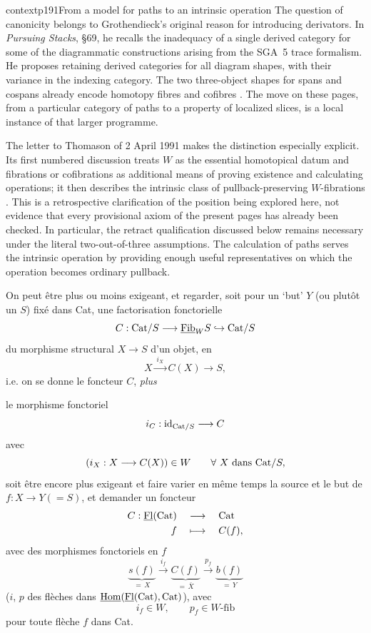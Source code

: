 \begin{dcomment}{context}{p191}{From a model for paths to an intrinsic operation}
The question of canonicity belongs to Grothendieck's original reason for introducing derivators. In \emph{Pursuing Stacks}, \S69, he recalls the inadequacy of a single derived category for some of the diagrammatic constructions arising from the SGA~5 trace formalism. He proposes retaining derived categories for all diagram shapes, with their variance in the indexing category. The two three-object shapes for spans and cospans already encode homotopy fibres and cofibres \citep[\S69, printed pp.~1--3]{Grothendieck1983}. The move on these pages, from a particular category of paths to a property of localized slices, is a local instance of that larger programme.

The letter to Thomason of 2 April 1991 makes the distinction especially explicit. Its first numbered discussion treats $W$ as the essential homotopical datum and fibrations or cofibrations as additional means of proving existence and calculating operations; it then describes the intrinsic class of pullback-preserving $W$-fibrations \citep[point~1, pp.~3--4]{Grothendieck1991Letter}. This is a retrospective clarification of the position being explored here, not evidence that every provisional axiom of the present pages has already been checked. In particular, the retract qualification discussed below remains necessary under the literal two-out-of-three assumptions. The calculation of paths serves the intrinsic operation by providing enough useful representatives on which the operation becomes ordinary pullback.
\end{dcomment}


On peut être plus ou moins exigeant, et regarder, soit pour un `but' $Y$ (ou plutôt un $S$) fixé dans Cat, une factorisation fonctorielle
\[
C : \mathrm{Cat}/S \longrightarrow \underline{\mathrm{Fib}}_W S \hookrightarrow \mathrm{Cat}/S
\]
du morphisme structural $X \longrightarrow S$ d'un objet, en
\[
X \xrightarrow{\ i_X\ } C(X) \longrightarrow S,
\]
i.e. on se donne le foncteur $C$, \textit{plus}

le morphisme fonctoriel
\[
i_C : \mathrm{id}_{\mathrm{Cat}/S} \longrightarrow C
\]
avec
\[
(i_X : X \longrightarrow C(X)) \in W \qquad \forall\ X \text{ dans } \mathrm{Cat}/S,
\]
soit être encore plus exigeant et faire varier en même temps la source et le but de $f : X \longrightarrow Y (= S)$, et demander un foncteur
\[
\begin{aligned}
C : \underline{\mathrm{Fl}}(\mathrm{Cat}) \quad &\longrightarrow \quad \mathrm{Cat} \\
f \quad &\longmapsto \quad C(f),
\end{aligned}
\]
avec des morphismes fonctoriels en $f$
\[
\underbrace{s(f)}_{=\,X} \xrightarrow{\ i_f\ } \underbrace{C(f)}_{=\,\bar{X}} \xrightarrow{\ p_f\ } \underbrace{b(f)}_{=\,Y}
\]
($i$, $p$ des flèches dans $\underline{\mathrm{Hom}}(\underline{\mathrm{Fl}}(\mathrm{Cat}),\mathrm{Cat})$), avec
\[
i_f \in W, \qquad p_f \in W\text{-fib}
\]
pour toute flèche $f$ dans Cat.

